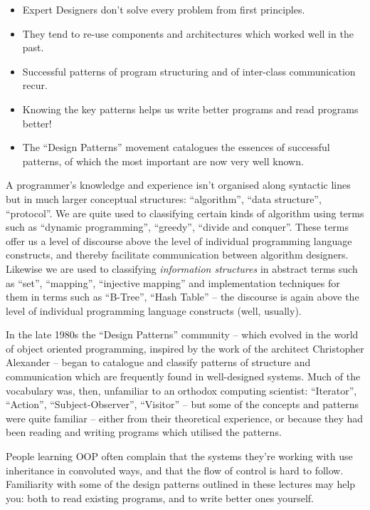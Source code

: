 \documentclass{ip3}
\begin{document}
\exercisenewpage
\answernewpage

\begin{foil}[Introduction]
\begin{itemize}
\item Expert Designers don't solve every problem from first principles.
\item They tend to re-use components and {architectures} which worked well in the past. 
\item Successful patterns of program structuring and of inter-class communication recur. 
\item Knowing the key patterns helps us write better programs and read programs better!
\item The ``Design Patterns'' movement catalogues the essences of successful patterns, of
which the most important are now very well known. 
\end{itemize}
\begin{note}\label{rationale}
A programmer's knowledge and experience isn't organised along syntactic lines
but in much larger conceptual structures: ``algorithm'', ``data structure'', 
``protocol''. We are quite used to classifying
certain kinds of algorithm using terms such as ``dynamic programming'', 
``greedy'', ``divide and conquer''. These terms offer us a level of
discourse above the level of individual programming language constructs,
and thereby facilitate communication between algorithm designers. Likewise
we are used to classifying {\em information structures} in abstract terms
such as ``set'', ``mapping'', ``injective mapping'' and implementation
techniques for them in terms such as ``B-Tree'', ``Hash Table'' -- the
discourse is again above the level of individual programming language constructs 
(well, usually).

In the late 1980s the ``Design Patterns'' community -- which evolved in the
world of object oriented programming, inspired by the work of  
the architect Christopher Alexander -- began to catalogue
and classify patterns of structure and communication which are 
frequently found  in well-designed systems. Much of the vocabulary
was, then, unfamiliar to an orthodox computing scientist: ``Iterator'',
``Action'', ``Subject-Observer'', ``Visitor'' -- but some of the
concepts and patterns were quite familiar -- either from
their theoretical experience, or because they
had been reading and writing programs which utilised the 
patterns.

People learning OOP often complain that the systems they're working with
use inheritance in convoluted ways, and that the flow of control is hard
to follow. Familiarity with some of the design patterns outlined in
these lectures may help you: both to read existing programs, and to
write better ones yourself.



\end{note}
\end{foil}
\end{document}
